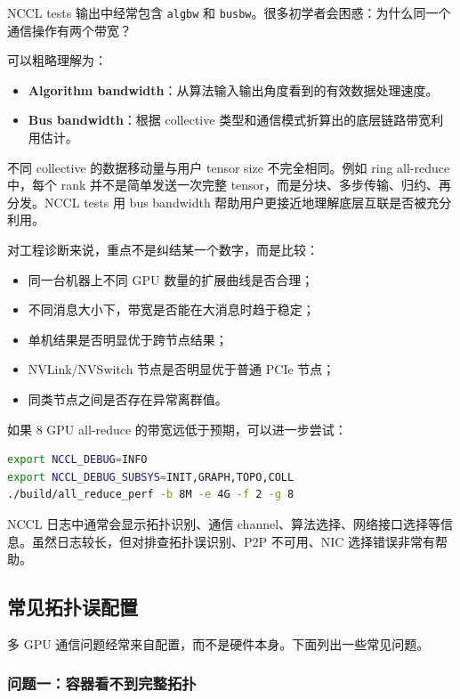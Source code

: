 NCCL tests 输出中经常包含 \texttt{algbw} 和 \texttt{busbw}。很多初学者会困惑：为什么同一个通信操作有两个带宽？

可以粗略理解为：

\begin{itemize}
  \item \textbf{Algorithm bandwidth}：从算法输入输出角度看到的有效数据处理速度。
  \item \textbf{Bus bandwidth}：根据 collective 类型和通信模式折算出的底层链路带宽利用估计。
\end{itemize}

不同 collective 的数据移动量与用户 tensor size 不完全相同。例如 ring all-reduce 中，每个 rank 并不是简单发送一次完整 tensor，而是分块、多步传输、归约、再分发。NCCL tests 用 bus bandwidth 帮助用户更接近地理解底层互联是否被充分利用。

对工程诊断来说，重点不是纠结某一个数字，而是比较：

\begin{itemize}
  \item 同一台机器上不同 GPU 数量的扩展曲线是否合理；
  \item 不同消息大小下，带宽是否能在大消息时趋于稳定；
  \item 单机结果是否明显优于跨节点结果；
  \item NVLink/NVSwitch 节点是否明显优于普通 PCIe 节点；
  \item 同类节点之间是否存在异常离群值。
\end{itemize}

如果 8 GPU all-reduce 的带宽远低于预期，可以进一步尝试：

\begin{lstlisting}[language=bash,caption={打开 NCCL 调试日志和拓扑信息},label={lst:nccl-debug-topo}]
export NCCL_DEBUG=INFO
export NCCL_DEBUG_SUBSYS=INIT,GRAPH,TOPO,COLL
./build/all_reduce_perf -b 8M -e 4G -f 2 -g 8
\end{lstlisting}

NCCL 日志中通常会显示拓扑识别、通信 channel、算法选择、网络接口选择等信息。虽然日志较长，但对排查拓扑误识别、P2P 不可用、NIC 选择错误非常有帮助。

\subsection{常见拓扑误配置}
\label{subsec:common-topology-misconfig}

多 GPU 通信问题经常来自配置，而不是硬件本身。下面列出一些常见问题。

\subsubsection{问题一：容器看不到完整拓扑}

